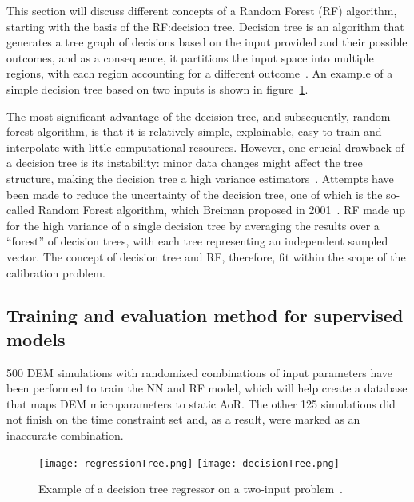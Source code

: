 This section will discuss different concepts of a Random Forest (RF) algorithm, starting with the basis of the RF:\@ decision tree. Decision tree is an algorithm that generates a tree graph of decisions based on the input provided and their possible outcomes, and as a consequence, it partitions the input space into multiple regions, with each region accounting for a different outcome~\cite{murphyML}. An example of a simple decision tree based on two inputs is shown in figure~\ref{fig:decisionTree}. 

The most significant advantage of the decision tree, and subsequently, random forest algorithm, is that it is relatively simple, explainable, easy to train and interpolate with little computational resources. However, one crucial drawback of a decision tree is its instability: minor data changes might affect the tree structure, making the decision tree a high variance estimators~\cite{murphyML}. Attempts have been made to reduce the uncertainty of the decision tree, one of which is the so-called Random Forest algorithm, which Breiman proposed in 2001~\cite{BreimanRF}. RF made up for the high variance of a single decision tree by averaging the results over a ``forest'' of decision trees, with each tree representing an independent sampled vector. The concept of decision tree and RF, therefore, fit within the scope of the calibration problem.

\subsection{Training and evaluation method for supervised models}  

500 DEM simulations with randomized combinations of input parameters have been performed to train the NN and RF model, which will help create a database that maps DEM microparameters to static AoR. The other 125 simulations did not finish on the time constraint set and, as a result, were marked as an inaccurate combination. 

\begin{figure}[H]
    \centering
    \texttt{[image: regressionTree.png]}
    \texttt{[image: decisionTree.png]}
    \caption{Example of a decision tree regressor on a two-input problem~\cite{murphyML}.}\label{fig:decisionTree}
\end{figure}





